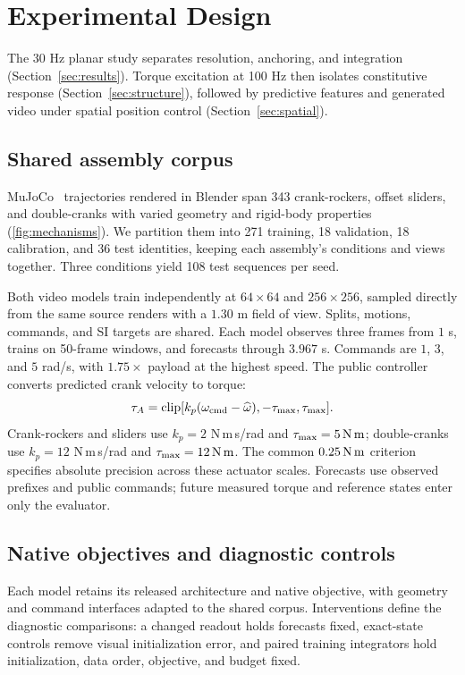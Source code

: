 \documentclass[10pt,twocolumn,letterpaper]{article}
\begin{document}
\section{Experimental Design}
\label{sec:design}
The 30 Hz planar study separates resolution, anchoring, and integration (Section~\ref{sec:results}). Torque excitation at 100 Hz then isolates constitutive response (Section~\ref{sec:structure}), followed by predictive features and generated video under spatial position control (Section~\ref{sec:spatial}).

\subsection{Shared assembly corpus}
MuJoCo~\cite{todorov2012mujoco} trajectories rendered in Blender span 343 crank-rockers, offset sliders, and double-cranks with varied geometry and rigid-body properties (\cref{fig:mechanisms}). We partition them into 271 training, 18 validation, 18 calibration, and 36 test identities, keeping each assembly's conditions and views together. Three conditions yield 108 test sequences per seed.

Both video models train independently at $64\times64$ and $256\times256$, sampled directly from the same source renders with a $1.30$ m field of view. Splits, motions, commands, and SI targets are shared. Each model observes three frames from $1$ s, trains on 50-frame windows, and forecasts through $3.967$ s. Commands are $1$, $3$, and $5$ rad/s, with $1.75\times$ payload at the highest speed. The public controller converts predicted crank velocity to torque:
\begin{equation}
\tau_A=\operatorname{clip}[k_p(\omega_{\rm cmd}-\widehat\omega),-\tau_{\max},\tau_{\max}].
\label{eq:servo}
\end{equation}
Crank-rockers and sliders use $k_p=2$ N\,m\,s/rad and $\tau_{\max}=5\,\mathrm{N\,m}$; double-cranks use $k_p=12$ N\,m\,s/rad and $\tau_{\max}=12\,\mathrm{N\,m}$. The common $0.25\,\mathrm{N\,m}$ criterion specifies absolute precision across these actuator scales. Forecasts use observed prefixes and public commands; future measured torque and reference states enter only the evaluator.

\subsection{Native objectives and diagnostic controls}
Each model retains its released architecture and native objective, with geometry and command interfaces adapted to the shared corpus. Interventions define the diagnostic comparisons: a changed readout holds forecasts fixed, exact-state controls remove visual initialization error, and paired training integrators hold initialization, data order, objective, and budget fixed.
\end{document}

